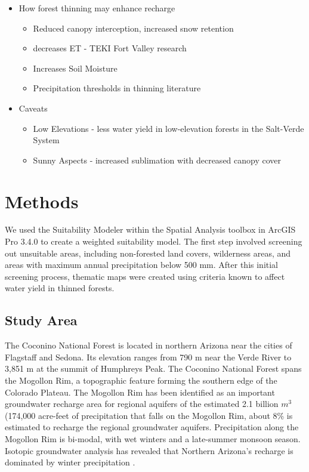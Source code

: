 \documentclass[
  number,
  preprint,
  3p,
  onecolumn]{elsarticle}
\begin{document}
\begin{itemize}
\item
  How forest thinning may enhance recharge

  \begin{itemize}
  \item
    Reduced canopy interception, increased snow retention
  \item
    decreases ET - TEKI Fort Valley research
  \item
    Increases Soil Moisture
  \item
    Precipitation thresholds in thinning literature
  \end{itemize}
\item
  Caveats

  \begin{itemize}
  \item
    Low Elevations - less water yield in low-elevation forests in the
    Salt-Verde System \citep{biederman_streamflow_2022}
  \item
    Sunny Aspects - increased sublimation with decreased canopy cover
    \citep{biederman_recent_2015}
  \end{itemize}
\end{itemize}

\section{Methods}\label{methods}

We used the Suitability Modeler within the Spatial Analysis toolbox in
ArcGIS Pro 3.4.0 to create a weighted suitability model. The first step
involved screening out unsuitable areas, including non-forested land
covers, wilderness areas, and areas with maximum annual precipitation
below 500 mm. After this initial screening process, thematic maps were
created using criteria known to affect water yield in thinned forests.

\subsection{Study Area}\label{study-area}

The Coconino National Forest is located in northern Arizona near the
cities of Flagstaff and Sedona. Its elevation ranges from 790 m near the
Verde River to 3,851 m at the summit of Humphreys Peak. The Coconino
National Forest spans the Mogollon Rim, a topographic feature forming
the southern edge of the Colorado Plateau. The Mogollon Rim has been
identified as an important groundwater recharge area for regional
aquifers \citep{parker2005} of the estimated 2.1 billion \(m^3\)
(174,000 acre-feet of precipitation that falls on the Mogollon Rim,
about 8\% is estimated to recharge the regional groundwater
aquifers\citep{parker2005}. Precipitation along the Mogollon Rim is
bi-modal, with wet winters and a late-summer monsoon season. Isotopic
groundwater analysis has revealed that Northern Arizona's recharge is
dominated by winter precipitation \citep{eastoe2007, eastoe2023}.
\end{document}
